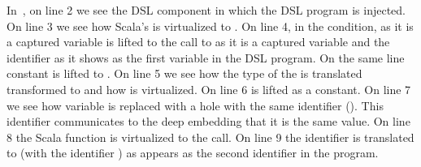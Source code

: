 In~, on line 2 we see the DSL component in which
 the DSL program is injected. On line 3 we see how Scala's  is virtualized
 to . On line 4, in the condition,  as it is a captured variable
 is lifted to the call to  as it is a captured variable
 and the identifier  as it shows as the first variable in the DSL program. On the same line constant  is lifted to . On line 5 we see how the type
 of the  is translated transformed to  and how
  is virtualized. On line 6  is lifted as a constant.
 On line 7 we see how variable  is replaced with a hole with the same identifier (). This identifier communicates to the deep embedding that it is the same value.
 On line 8 the Scala function is virtualized to the  call. On line
 9 the identifier  is translated to  (with the identifier ) as
  appears as the second identifier in the program.


